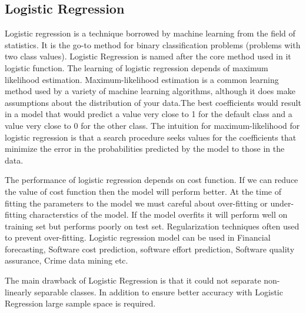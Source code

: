 \subsection{Logistic Regression}
Logistic regression\cite{sharma2015active} is a technique borrowed by machine learning from the field of statistics. It is the go-to method for binary classification problems (problems with two class values). Logistic Regression is named after the core method used in it logistic function. The learning of logistic regression depends of maximum likelihood estimation. Maximum-likelihood estimation is a common learning method used by a variety of machine learning algorithms, although it does make assumptions about the distribution of your data.The best coefficients would result in a model that would predict a value very close to 1 for the default class and a value very close to 0 for the other class. The intuition for maximum-likelihood for logistic regression is that a search procedure seeks values for the coefficients that minimize the error in the probabilities predicted by the model to those in the data.
\par
\vspace{0.5cm}
The performance of logistic regression depends on cost function. If we can reduce the value of cost function then the model will perform better. At the time of fitting the parameters to the model we must careful about over-fitting or under-fitting characterstics of the model. If the model overfits it will perform well on training set but performs poorly on test set. Regularization techniques often used to prevent over-fitting. Logistic regression model can be used in Financial forecasting, Software cost prediction, software effort prediction, Software quality assurance, Crime data mining etc. 
\par
\vspace{0.5cm}
The main drawback of Logistic Regression is that it could not separate non-linearly separable classes. In addition to ensure better accuracy with Logistic Regression large sample space is required.

